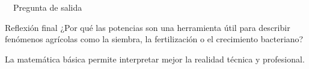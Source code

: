 \documentclass[aspectratio=169,10pt,handout]{beamer}
\newcommand{\iconoCierre}{\faCheckCircle}
\begin{document}
	\begin{frame}{\iconoCierre\ \ Pregunta de salida}
		\begin{exampleblock}{Reflexión final}
			¿Por qué las potencias son una herramienta útil para describir fenómenos agrícolas como la siembra, la fertilización o el crecimiento bacteriano?
		\end{exampleblock}
		
		\vspace{0.5cm}
		
		\begin{center}
			{\Large\color{USTTeal}\faSeedling}
			
			\vspace{0.25cm}
			
			{\normalsize\textcolor{USTGray}{La matemática básica permite interpretar mejor la realidad técnica y profesional.}}
		\end{center}
	\end{frame}
	
\end{document}
